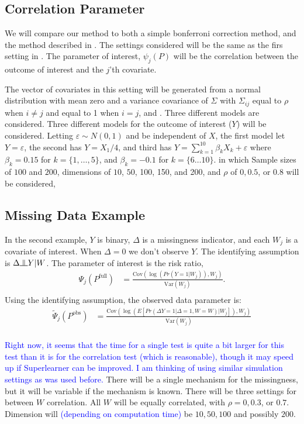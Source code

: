 \documentclass{article}
\newcommand{\indep}{\raisebox{0.05em}{\rotatebox[origin=c]{90}{$\models$}}}
\begin{document}
\subsection{Correlation Parameter}
We will compare our method to both a simple bonferroni correction method, and the method described in \citep{zhang_comment_2015}.  The settings considered will be the same as the firs setting in \citep{mckeague_adaptive_2015}.  The parameter of interest, $\psi_j(P)$ will be the correlation between the outcome of interest and the $j$'th covariate. 

The vector of covariates in this setting will be generated from a normal distribution with mean zero and a variance covariance of $\Sigma$ with $\Sigma_{ij}$ equal to $\rho$ when $i \neq j$ and equal to 1 when $i = j$, and .  Three different models are considered.  Three different models for the outcome of interest ($Y$) will be considered. Letting $\varepsilon \sim N(0, 1)$ and be independent of $X$, the first model let $Y = \varepsilon$, the second has $Y = X_1 / 4$, and third has $Y = \sum_{k = 1}^10 \beta_k X_k + \varepsilon$ where $\beta_k = 0.15$ for $k = \{1, \dots, 5\}$, and $\beta_k = -0.1$ for $k = \{6 \dots 10\}$.   in which Sample sizes of $100$ and $200$, dimensions of $10$, $50$, 100, 150, and 200, and $\rho$ of  $0, 0.5$, or $0.8$ will be considered,

\subsection{Missing Data Example}
In the second example, $Y$ is binary, $\Delta$ is a missingness indicator, and each $W_j$ is a covariate of interest.  When $\Delta = 0$ we don't observe $Y$.  The identifying assumption is $\Delta \indep Y | W$.  The parameter of interest is the risk ratio,
\begin{align*}
	\Psi_{j}\left(P^{\text{full}}\right) &= \frac{\text{Cov}\left(\log\left(Pr \left(Y = 1 |  W_j\right)\right), W_j\right)}{\text{Var}(W_j)}.\\
\end{align*}
Using the identifying assumption, the observed data parameter is:
\begin{align*}
	\tilde{\Psi}_{j}\left(P^{\text{obs}}\right)&= \frac{\text{Cov}\left(\log\left(E\left[Pr \left(\Delta  Y = 1 | \Delta = 1, W = W\right) |  W_j\right]\right), W_j\right)}{\text{Var}(W_j)}\\
\end{align*}

\textcolor{blue}{Right now, it seems that the time for a single test is quite a bit larger for this test than it is for the correlation test (which is reasonable), though it may speed up if Superlearner can be improved.  I am thinking of using similar simulation settings as was used before.}  There will be a single mechanism for the missingness, but it will be variable if the mechanism is known.  There will be three settings for between $W$ correlation.  All $W$ will be equally correlated, with $\rho = 0, 0.3$, or $0.7$.  Dimension will \textcolor{blue}{(depending on computation time)} be $10, 50, 100$ and possibly $200$.  
\end{document}
